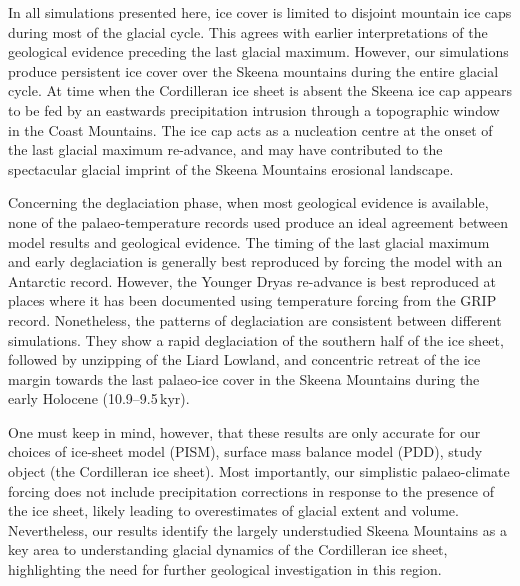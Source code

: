 \documentclass[tc, ms]{copernicus}
\begin{document}
In all simulations presented here, ice cover is limited to disjoint mountain ice
caps during most of the glacial cycle. This agrees with earlier interpretations
of the geological evidence preceding the last glacial maximum. However, our
simulations produce persistent ice cover over the Skeena mountains during
the entire glacial cycle. At time when the Cordilleran ice sheet is absent
the Skeena ice cap appears to be fed by an eastwards precipitation
intrusion through a topographic window in the Coast Mountains. The ice cap acts
as a nucleation centre at the onset of the last glacial maximum re-advance, and
may have contributed to the spectacular glacial imprint of the Skeena Mountains
erosional landscape.

Concerning the deglaciation phase, when most geological evidence is available,
none of the palaeo-temperature records used produce an ideal agreement between
model results and geological evidence. The
timing of the last glacial maximum and early deglaciation is generally best
reproduced by forcing the model with an Antarctic
record. However, the Younger Dryas re-advance is best reproduced at places
where it has been documented using temperature forcing from the GRIP record.
Nonetheless, the patterns of deglaciation are consistent between different
simulations. They show a rapid deglaciation of the southern half of the ice
sheet, followed by unzipping of the Liard Lowland, and concentric retreat of
the ice margin towards the last palaeo-ice cover in the Skeena Mountains
during the early Holocene (10.9--9.5\,\unit{kyr}).

One must keep in mind, however, that these results are only accurate for our
choices of ice-sheet model (PISM), surface mass balance model (PDD), study
object (the Cordilleran ice sheet). Most importantly, our simplistic
palaeo-climate forcing does not include precipitation corrections in response
to the presence of the ice sheet, likely leading to overestimates of glacial
extent and volume. Nevertheless, our results identify the largely understudied
Skeena Mountains as a key area to understanding glacial dynamics of the
Cordilleran ice sheet, highlighting the need for further geological
investigation in this region.


%
\newpage
\end{document}
